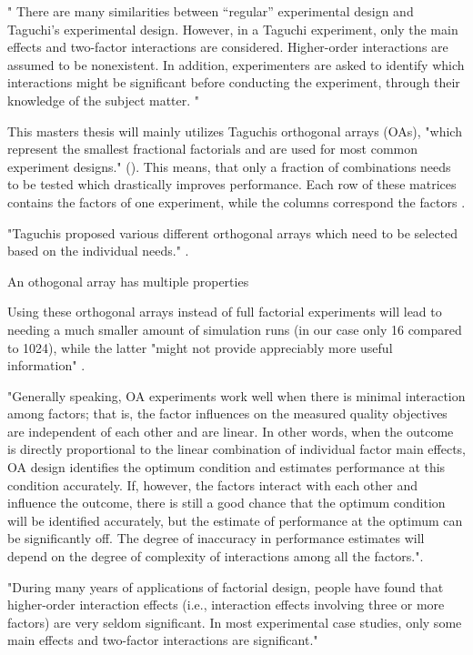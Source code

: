 "
There are many similarities between “regular” experimental design and Taguchi’s experimental design. However, in a Taguchi experiment, only the main effects and two-factor interactions are considered. Higher-order interactions are assumed to be nonexistent. In addition, experimenters are asked to identify which interactions might be significant before conducting the experiment, through their knowledge of the subject matter.
"\cite{yang_design_2009}


This masters thesis will mainly utilizes Taguchis orthogonal arrays (OAs), "which represent the smallest fractional factorials and are used for most common experiment designs." (\cite{roy_primer_1990}). This means, that only a fraction of combinations needs to be tested which drastically improves performance. Each row of these matrices contains the factors of one experiment, while the columns correspond the factors \cite{li_taguchi_2021}. 

"Taguchis proposed various different orthogonal arrays which need to be selected based on the individual needs."  \cite{li_taguchi_2021}.

An othogonal array has multiple properties

Using these orthogonal arrays instead of full factorial experiments will lead to needing a much smaller amount of simulation runs (in our case only 16 compared to 1024), while the latter "might not provide appreciably more useful information" \cite{roy_primer_1990}.


"Generally speaking, OA experiments work well when there is minimal interaction among factors; that is, the factor influences on the measured quality objectives are independent of each other and are linear. In other words, when the outcome is directly proportional to the linear combination of individual factor main effects, OA design identifies the optimum condition and estimates performance at this condition accurately. If, however, the factors interact with each other and influence the outcome, there is still a good chance that the optimum condition will be identified accurately, but the estimate of performance at the optimum can be significantly off. The degree of inaccuracy in performance estimates will depend on the degree of complexity of interactions among all the factors."\cite{roy_primer_1990}.


"During many years of applications of factorial design, people have found that higher-order interaction effects (i.e., interaction effects involving three or more factors) are very seldom significant. In most experimental case studies, only some main effects and two-factor interactions are significant."\cite{yang_design_2009}


